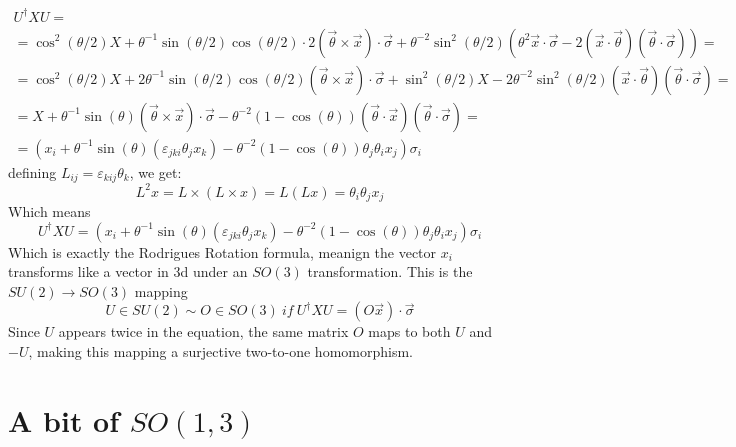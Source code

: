 \documentclass{article}
\begin{document}
\begin{equation}
\begin{gathered}
    U^\dagger X U = \\ = \cos^2(\theta/2)X + \theta^{-1}\sin(\theta/2)\cos(\theta/2)\cdot2(\vec{\theta}\times\vec{x})\cdot\vec{\sigma} + \theta^{-2}\sin^2(\theta/2)\left(\theta^2\vec{x}\cdot\vec{\sigma} - 2(\vec{x}\cdot\vec{\theta})(\vec{\theta}\cdot\vec{\sigma})\right) = \\ =
    \cos^2(\theta/2)X + 2\theta^{-1}\sin(\theta/2)\cos(\theta/2)(\vec{\theta}\times\vec{x})\cdot\vec{\sigma} + \sin^2(\theta/2)X - 2\theta^{-2}\sin^2(\theta/2)(\vec{x}\cdot\vec{\theta})(\vec{\theta}\cdot\vec{\sigma}) = \\ =
    X + \theta^{-1}\sin(\theta)(\vec{\theta}\times\vec{x})\cdot\vec{\sigma} - \theta^{-2}(1 - \cos(\theta))(\vec{\theta}\cdot\vec{x})(\vec{\theta}\cdot\vec{\sigma}) = \\ =
    \left(x_i + \theta^{-1}\sin(\theta)(\varepsilon_{jki} \theta_j x_k) - \theta^{-2}(1 - \cos(\theta))\theta_j\theta_ix_j\right)\sigma_i
\end{gathered}
\end{equation}
defining $L_{ij} = \varepsilon_{kij}\theta_k$, we get:
\begin{equation}
    L^2x = L\times(L\times x) = L(Lx) = \theta_i\theta_jx_j
\end{equation}
Which means
\begin{equation}
    U^\dagger X U = \left(x_i + \theta^{-1}\sin(\theta)(\varepsilon_{jki} \theta_j x_k) - \theta^{-2}(1 - \cos(\theta))\theta_j\theta_ix_j\right)\sigma_i
\end{equation}
Which is exactly the Rodrigues Rotation formula, meanign the vector $x_i$ transforms like a vector in 3d under an $SO(3)$ transformation.
\newline
This is the $SU(2) \rightarrow SO(3)$ mapping
\begin{equation}
    U \in SU(2) \sim O \in SO(3) \ if \ U^\dagger X U = (O\vec{x})\cdot\vec{\sigma}
\end{equation}
Since $U$ appears twice in the equation, the same matrix $O$ maps to both $U$ and $-U$, making this mapping a surjective two-to-one homomorphism.
\newpage
\section{A bit of $SO(1,3)$}
\end{document}
